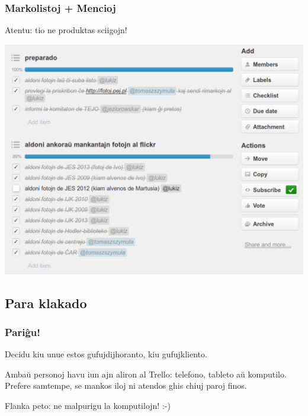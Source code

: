   \begin{frame}
    \frametitle{Markolistoj + Mencioj}
    
	\begin{center}
    	Atentu: \alert{tio ne produktas sciigojn!}
	\end{center}
		
	\begin{center}
		\includegraphics[scale=0.175]{ekranoj/markolistoj-kun-mencioj}
	\end{center}
	
  \end{frame}


\subsection{Para klakado}
  \begin{frame}
    \frametitle{Pariĝu!}
    Decidu kiu unue estos gufujdijhoranto, kiu gufujkliento.
    
    Ambaŭ personoj havu iun ajn aliron al Trello: telefono, tableto aŭ komputilo. Prefere samtempe, se mankos iloj ni atendos ghis chiuj paroj finos.
    
    Flanka peto: ne malpurigu la komputilojn! :-)
    
  \end{frame}

